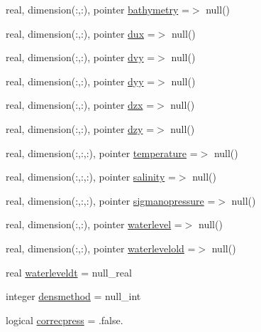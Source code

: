 \begin{DoxyCompactItemize}
\item 
real, dimension(\+:,\+:), pointer \mbox{\hyperlink{structmoduleturbulence_1_1t__external_af36adf2c295d7186d5ee9af82557ef4b}{bathymetry}} =$>$ null()
\item 
real, dimension(\+:,\+:), pointer \mbox{\hyperlink{structmoduleturbulence_1_1t__external_a01678a9207b166073306a35562ca86ca}{dux}} =$>$ null()
\item 
real, dimension(\+:,\+:), pointer \mbox{\hyperlink{structmoduleturbulence_1_1t__external_a7714994e44d3420566955b43de65eee9}{dvy}} =$>$ null()
\item 
real, dimension(\+:,\+:), pointer \mbox{\hyperlink{structmoduleturbulence_1_1t__external_a0a1ceb9432fcadab867e3694545f96be}{dyy}} =$>$ null()
\item 
real, dimension(\+:,\+:), pointer \mbox{\hyperlink{structmoduleturbulence_1_1t__external_ab56a9117445c00092ece9c9f75751334}{dzx}} =$>$ null()
\item 
real, dimension(\+:,\+:), pointer \mbox{\hyperlink{structmoduleturbulence_1_1t__external_a3aee240c95895f2202971d64fe9f9b45}{dzy}} =$>$ null()
\item 
real, dimension(\+:,\+:,\+:), pointer \mbox{\hyperlink{structmoduleturbulence_1_1t__external_a15c747d736b40fe995e5f569c3208c17}{temperature}} =$>$ null()
\item 
real, dimension(\+:,\+:,\+:), pointer \mbox{\hyperlink{structmoduleturbulence_1_1t__external_af3395f5e91d5497a81f77c90aafd7f22}{salinity}} =$>$ null()
\item 
real, dimension(\+:,\+:,\+:), pointer \mbox{\hyperlink{structmoduleturbulence_1_1t__external_a3ac506e0a2cbd45ba521fbc3d633fc95}{sigmanopressure}} =$>$ null()
\item 
real, dimension(\+:,\+:), pointer \mbox{\hyperlink{structmoduleturbulence_1_1t__external_aa19f3a799ff84443687545943ca353c3}{waterlevel}} =$>$ null()
\item 
real, dimension(\+:,\+:), pointer \mbox{\hyperlink{structmoduleturbulence_1_1t__external_af9af0bcd9f547c9bae9d7fc52a897a78}{waterlevelold}} =$>$ null()
\item 
real \mbox{\hyperlink{structmoduleturbulence_1_1t__external_a7d9f3c1000cea2e0c138cf12f9c16b25}{waterleveldt}} = null\+\_\+real
\item 
integer \mbox{\hyperlink{structmoduleturbulence_1_1t__external_aeac089a9b7af04e58ded9cd49d9e5487}{densmethod}} = null\+\_\+int
\item 
logical \mbox{\hyperlink{structmoduleturbulence_1_1t__external_a6f5bd281b373bf14dfd75f74ae3ec132}{correcpress}} = .false.

\end{DoxyCompactItemize}
